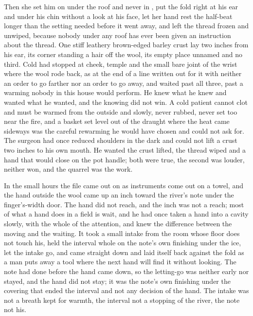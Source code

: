 Then she set him on  under the roof and never in , put the fold right at his ear and under his chin without a look at his face, let her hand rest the half-beat longer than the setting needed before it went away, and left the thread frozen and unwiped, because nobody under any roof has ever been given an instruction about the thread. One stiff leathery brown-edged barley crust lay two inches from his ear, its corner standing a hair off the wool, its empty place unnamed and no third. Cold had stopped at cheek, temple and the small bare joint of the wrist where the wool rode back, as at the end of a line written out for it with neither an order to go farther nor an order to go away, and  waited past all three, past a warming nobody in this house would perform. He knew what he knew and wanted what he wanted, and the knowing did not win. A cold patient cannot clot and must be warmed from the outside and slowly, never rubbed, never set too near the fire, and a basket set level out of the draught where the heat came sideways was the careful rewarming he would have chosen and could not ask for. The surgeon had once reduced shoulders in the dark and could not lift a crust two inches to his own mouth. He wanted the crust lifted, the thread wiped and a hand that would close on the pot handle; both were true, the second was louder, neither won, and the quarrel was the work.

In the small hours the file came out on  as instruments come out on a towel, and the hand outside the wool came up an inch toward the river's note under the finger's-width door. The hand did not reach, and the inch was not a reach; most of what a hand does in a field is wait, and he had once taken a hand into a cavity slowly, with the whole of the attention, and knew the difference between the moving and the waiting. It took a small intake from the room whose floor does not touch his, held the interval whole on the note's own finishing under the ice, let the intake go, and came straight down and laid itself back against the fold as a man puts away a tool where the next hand will find it without looking. The note had done before the hand came down, so the letting-go was neither early nor stayed, and the hand did not stay; it was the note's own finishing under the covering that ended the interval and not any decision of the hand. The intake was not a breath kept for warmth, the interval not a stopping of the river, the note not his.

